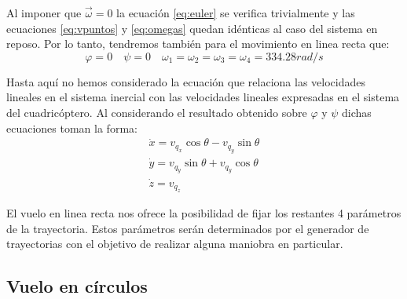 \documentclass[main]{subfiles}
\begin{document}
Al imponer que $\vec{\omega}=0$ la ecuaci\'on \ref{eq:euler} se verifica trivialmente y las ecuaciones \ref{eq:vpuntos} y \ref{eq:omegas} quedan id\'enticas al caso del sistema en reposo. Por lo tanto, tendremos tambi\'en para el movimiento en linea recta que:
\begin{equation}
\varphi=0 \quad \psi=0 \quad \omega_1=\omega_2=\omega_3=\omega_4 = 334.28 rad/s
\end{equation}

Hasta aqu\'i no hemos considerado la ecuaci\'on que relaciona las velocidades lineales en el sistema inercial con las velocidades lineales expresadas en el sistema del cuadric\'optero. Al considerando el resultado obtenido sobre $\varphi$ y $\psi$ dichas ecuaciones toman la forma:
\begin{equation}\begin{array}{c}
\dot{x}=v_{q_x}\cos\theta-v_{q_y}\sin\theta\\
\dot{y}=v_{q_y}\sin\theta+v_{q_y}\cos\theta\\
\dot{z}=v_{q_z}
\end{array}
\end{equation} 

El vuelo en linea recta nos ofrece la posibilidad de fijar los restantes 4 par\'ametros de la trayectoria. Estos par\'ametros ser\'an determinados por el generador de trayectorias con el objetivo de realizar alguna maniobra en particular. 

\subsection{Vuelo en c\'irculos}
\end{document}
